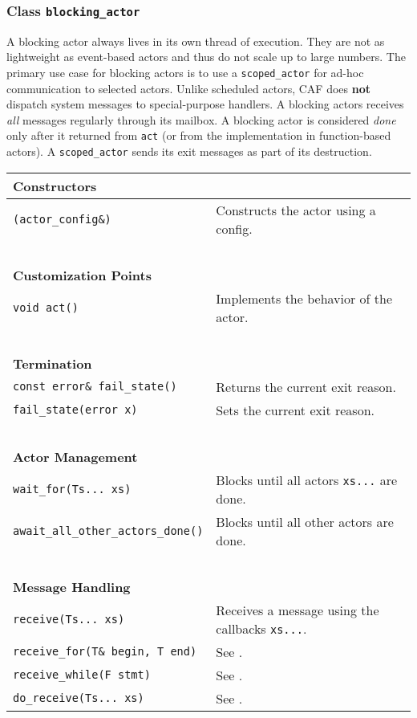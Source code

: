 \clearpage
\subsubsection{Class \lstinline^blocking_actor^}

A blocking actor always lives in its own thread of execution. They are not as
lightweight as event-based actors and thus do not scale up to large numbers.
The primary use case for blocking actors is to use a \lstinline^scoped_actor^
for ad-hoc communication to selected actors. Unlike scheduled actors, CAF does
\textbf{not} dispatch system messages to special-purpose handlers. A blocking
actors receives \emph{all} messages regularly through its mailbox. A blocking
actor is considered \emph{done} only after it returned from \lstinline^act^ (or
from the implementation in function-based actors). A \lstinline^scoped_actor^
sends its exit messages as part of its destruction.

\begin{center}
\begin{tabular}{ll}
  \textbf{Constructors} & ~ \\
  \hline
  \lstinline^(actor_config&)^ & Constructs the actor using a config. \\
  \hline
  ~ & ~ \\ \textbf{Customization Points} & ~ \\
  \hline
  \lstinline^void act()^ & Implements the behavior of the actor. \\
  \hline
  ~ & ~ \\ \textbf{Termination} & ~ \\
  \hline
  \lstinline^const error& fail_state()^ & Returns the current exit reason. \\
  \hline
  \lstinline^fail_state(error x)^ & Sets the current exit reason. \\
  \hline
  ~ & ~ \\ \textbf{Actor Management} & ~ \\
  \hline
  \lstinline^wait_for(Ts... xs)^ & Blocks until all actors \lstinline^xs...^ are done. \\
  \hline
  \lstinline^await_all_other_actors_done()^ & Blocks until all other actors are done. \\
  \hline
  ~ & ~ \\ \textbf{Message Handling} & ~ \\
  \hline
  \lstinline^receive(Ts... xs)^ & Receives a message using the callbacks \lstinline^xs...^. \\
  \hline
  \lstinline^receive_for(T& begin, T end)^ & See . \\
  \hline
  \lstinline^receive_while(F stmt)^ & See . \\
  \hline
  \lstinline^do_receive(Ts... xs)^ & See . \\
  \hline
\end{tabular}
\end{center}

